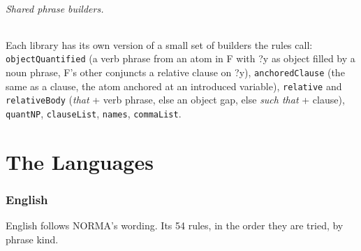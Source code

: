 \documentclass[11pt, a4paper]{article}
\newcommand{\code}[1]{\texttt{\color{codefg}#1}}
\begin{document}
\paragraph{Shared phrase builders.}
Each library has its own version of a small set of builders the rules call:
\code{objectQuantified} (a verb phrase from an atom in F with ?y as object
filled by a noun phrase, F's other conjuncts a relative clause on ?y),
\code{anchoredClause} (the same as a clause, the atom anchored at an
introduced variable), \code{relative} and \code{relativeBody} (\textit{that}
+ verb phrase, else an object gap, else \textit{such that} + clause),
\code{quantNP}, \code{clauseList}, \code{names}, \code{commaList}.

\part{The Languages}

\section{English}
\label{sec:languages}
\label{sec:english}

English follows NORMA's wording. Its 54 rules, in the order they are tried, by phrase kind.

\end{document}

